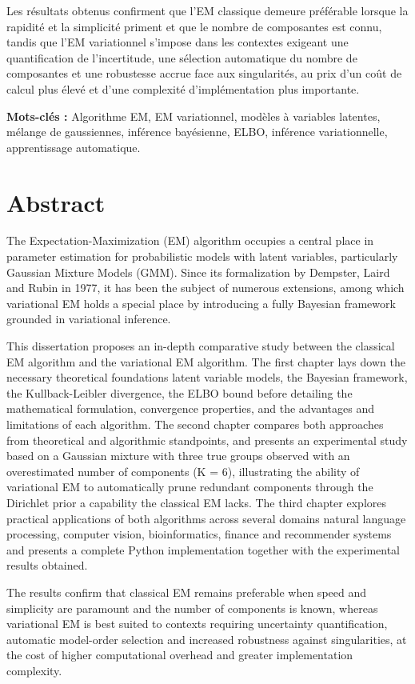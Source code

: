 Les résultats obtenus confirment que l'EM classique demeure préférable lorsque la rapidité et la simplicité priment et que le nombre de composantes est connu, tandis que l'EM variationnel s'impose dans les contextes exigeant une quantification de l'incertitude, une sélection automatique du nombre de composantes et une robustesse accrue face aux singularités, au prix d'un coût de calcul plus élevé et d'une complexité d'implémentation plus importante.

\textbf{Mots-clés : }Algorithme EM, EM variationnel, modèles à variables latentes, mélange de gaussiennes, inférence bayésienne, ELBO, inférence variationnelle, apprentissage automatique.


\chapter*{Abstract}
The Expectation-Maximization (EM) algorithm occupies a central place in parameter estimation for probabilistic models with latent variables, particularly Gaussian Mixture Models (GMM). Since its formalization by Dempster, Laird and Rubin in 1977, it has been the subject of numerous extensions, among which variational EM holds a special place by introducing a fully Bayesian framework grounded in variational inference.

This dissertation proposes an in-depth comparative study between the classical EM algorithm and the variational EM algorithm. The first chapter lays down the necessary theoretical foundations  latent variable models, the Bayesian framework, the Kullback-Leibler divergence, the ELBO bound  before detailing the mathematical formulation, convergence properties, and the advantages and limitations of each algorithm. The second chapter compares both approaches from theoretical and algorithmic standpoints, and presents an experimental study based on a Gaussian mixture with three true groups observed with an overestimated number of components (K = 6), illustrating the ability of variational EM to automatically prune redundant components through the Dirichlet prior  a capability the classical EM lacks. The third chapter explores practical applications of both algorithms across several domains  natural language processing, computer vision, bioinformatics, finance and recommender systems  and presents a complete Python implementation together with the experimental results obtained.

The results confirm that classical EM remains preferable when speed and simplicity are paramount and the number of components is known, whereas variational EM is best suited to contexts requiring uncertainty quantification, automatic model-order selection and increased robustness against singularities, at the cost of higher computational overhead and greater implementation complexity.


